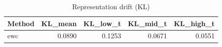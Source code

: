 \begin{table}[htbp]
\centering
\caption{Representation drift (KL)}
\label{tab:repr-drift}
\begin{tabular}{lrrrr}
\toprule
\textbf{Method} & \textbf{KL\_mean} & \textbf{KL\_low\_t} & \textbf{KL\_mid\_t} & \textbf{KL\_high\_t} \\
\midrule
ewc & 0.0890 & 0.1253 & 0.0671 & 0.0551 \\
\bottomrule
\end{tabular}
\end{table}